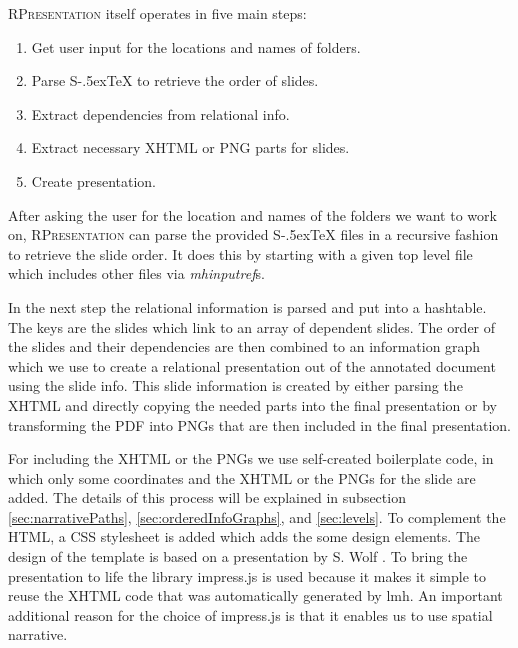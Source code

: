 \documentclass{llncs}
\def\stex{\texorpdfstring{\raisebox{-.5ex}S\kern-.5ex\TeX}{sTeX}\xspace}
\def\sTeX{\stex}
\newcommand{\sys}{\textsc{RPresentation}\xspace}
\begin{document}
\sys itself operates in five main steps:
\vspace{-12pt}
\begin{enumerate}[topsep=0pt,itemsep=-1ex,partopsep=1ex,parsep=1ex]
\item Get user input for the locations and names of folders.
\item Parse \sTeX to retrieve the order of slides.
\item Extract dependencies from relational info.
\item Extract necessary XHTML or PNG parts for slides.
\item Create presentation.
\end{enumerate}
\vspace{5pt}

After asking the user for the location and names of the folders we want to work on, \sys can parse the provided \stex files in a recursive fashion to retrieve the slide order. It does this by starting with a given top level file which includes other files via \textit{mhinputref}s.

In the next step the relational information is parsed and put into a hashtable. The keys are the slides which link to an array of dependent slides. The order of the slides and their dependencies are then combined to an information graph which we use to create a relational presentation out of the annotated document using the slide info. This slide information is created by either parsing the XHTML and directly copying the needed parts into the final presentation or by transforming the PDF into PNGs that are then included in the final presentation.

For including the XHTML or the PNGs we use self-created boilerplate code, in which only some coordinates and the XHTML or the PNGs for the slide are added. The details of this process will be explained in subsection \ref{sec:narrativePaths}, \ref{sec:orderedInfoGraphs}, and \ref{sec:levels}. To complement the HTML, a CSS stylesheet is added which adds the some design elements. The design of the template is based on a presentation by S. Wolf \cite{Wolf:npentrel15}. To bring the presentation to life the library impress.js is used because it makes it simple to reuse the XHTML code that was automatically generated by lmh. An important additional reason for the choice of impress.js \cite{JSImpress:npentrel14} is that it enables us to use spatial narrative.
\end{document}
